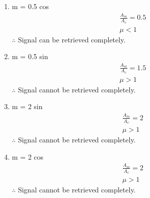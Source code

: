 \documentclass[journal,12pt,twocolumn]{IEEEtran}
\theoremstyle{remark}
\begin{document}
\begin{enumerate}

    \item m = 0.5 cos 
\begin{align}
    \frac{A_m}{A_c}= 0.5 \\
    \mu <1
\end{align}
$\therefore$ Signal can be retrieved completely.
\item m = 0.5 sin 
\begin{align}
    \frac{A_m}{A_c}= 1.5\\
    \mu >1
\end{align}
$\therefore$ Signal cannot be retrieved completely.
\item m = 2 sin 
\begin{align}
    \frac{A_m}{A_c}= 2\\
    \mu >1
\end{align}
$\therefore$ Signal cannot be retrieved completely.
\item m = 2 cos 
\begin{align}
    \frac{A_m}{A_c}= 2\\
    \mu > 1
\end{align}
$\therefore$ Signal cannot be retrieved completely.


\end{enumerate}
\end{document}
